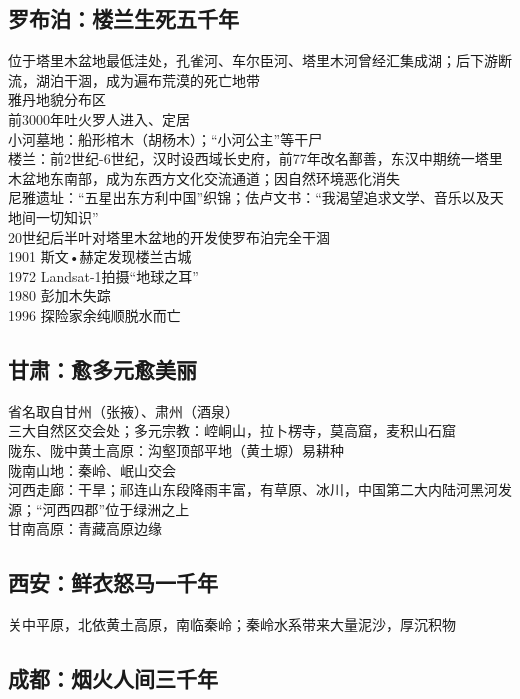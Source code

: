 \subsection*{罗布泊：楼兰生死五千年}

位于塔里木盆地最低洼处，孔雀河、车尔臣河、塔里木河曾经汇集成湖；后下游断流，湖泊干涸，成为遍布荒漠的死亡地带\\
雅丹地貌分布区\\
前3000年吐火罗人进入、定居\\
小河墓地：船形棺木（胡杨木）；“小河公主”等干尸\\
楼兰：前2世纪-6世纪，汉时设西域长史府，前77年改名鄯善，东汉中期统一塔里木盆地东南部，成为东西方文化交流通道；因自然环境恶化消失\\
尼雅遗址：“五星出东方利中国”织锦；{佉}卢文书：“我渴望追求文学、音乐以及天地间一切知识”\\
20世纪后半叶对塔里木盆地的开发使罗布泊完全干涸\\
1901 斯文•赫定发现楼兰古城\\
1972 Landsat-1拍摄“地球之耳”\\
1980 彭加木失踪\\
1996 探险家余纯顺脱水而亡

\subsection*{甘肃：愈多元愈美丽}

省名取自甘州（张掖）、肃州（酒泉）\\
三大自然区交会处；多元宗教：崆峒山，拉卜楞寺，莫高窟，麦积山石窟\\
陇东、陇中黄土高原：沟壑顶部平地（黄土塬）易耕种\\
陇南山地：秦岭、岷山交会\\
河西走廊：干旱；祁连山东段降雨丰富，有草原、冰川，中国第二大内陆河黑河发源；“河西四郡”位于绿洲之上\\
甘南高原：青藏高原边缘

\subsection*{西安：鲜衣怒马一千年}

关中平原，北依黄土高原，南临秦岭；秦岭水系带来大量泥沙，厚沉积物

\subsection*{成都：烟火人间三千年}

